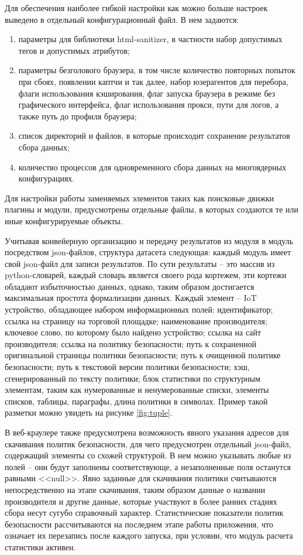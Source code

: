 \documentclass[../main]{subfiles}
\begin{document}
Для обеспечения наиболее гибкой настройки как можно больше настроек выведено в отдельный конфигурационный файл. В нем задаются:

\begin{enumerate}
    \item параметры для библиотеки html-sanitizer, в частности набор допустимых тегов и допустимых атрибутов;
    \item параметры безголового браузера, в том числе количество повторных попыток при сбоях, появлении каптчи и так далее, набор юзерагентов для перебора, флаги использования кэширования, флаг запуска браузера в режиме без графического интерфейса, флаг использования прокси, пути для логов, а также путь до профиля браузера;
    \item список директорий и файлов, в которые происходит сохранение результатов сбора данных;
    \item количество процессов для одновременного сбора данных на многоядерных конфигурациях.
\end{enumerate}

Для настройки работы заменяемых элементов таких как поисковые движки плагины и модули, предусмотрены отдельные файлы, в которых создаются те или иные конфигурируемые объекты.

Учитывая конвейерную организацию и передачу результатов из модуля в модуль посредством json-файлов, структура датасета следующая: каждый модуль имеет свой json-файл для записи результатов. По сути результаты – это массив из python-словарей, каждый словарь является своего рода кортежем, эти кортежи обладают избыточностью данных, однако, таким образом достигается максимальная простота формализации данных. Каждый элемент – IoT устройство, обладающее набором информационных полей: идентификатор; ссылка на страницу на торговой площадке; наименование производителя; ключевое слово, по которому было найдено устройство; ссылка на сайт производителя; ссылка на политику безопасности; путь к сохраненной оригинальной страницы политики безопасности; путь к очищенной политике безопасности; путь к текстовой версии политики безопасности; хэш, сгенерированный по тексту политики; блок статистики по структурным элементам, таким как нумерованные и ненумерованные списки, элементы списков, таблицы, параграфы, длина политики в символах. Пример такой разметки можно увидеть на рисунке \ref{fig:tuple}.

В веб-краулере также предусмотрена возможность явного указания адресов для скачивания политик безопасности, для чего предусмотрен отдельный json-файл, содержащий элементы со схожей структурой. В нем можно указывать любые из полей – они будут заполнены соответствующе, а незаполненные поля останутся равными <<null>>. Явно заданные для скачивания политики считываются непосредственно на этапе скачивания, таким образом данные о названии производителя и другие данные, которые участвуют в более ранних стадиях сбора несут сугубо справочный характер. Статистические показатели политик безопасности рассчитываются на последнем этапе работы приложения, что означает их перезапись после каждого запуска, при условии, что модуль расчета статистики активен.
\end{document}

